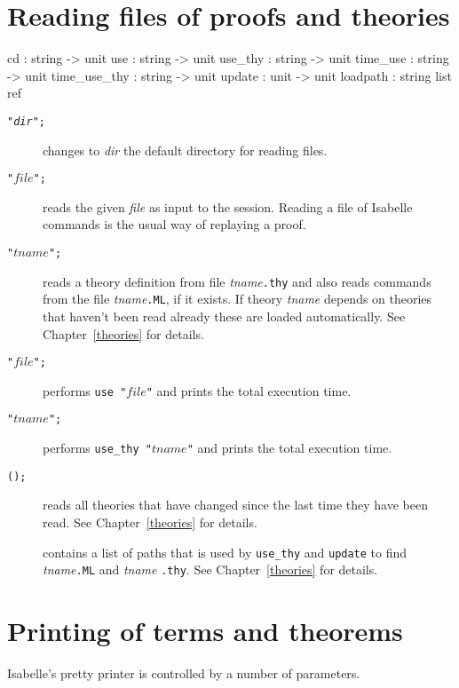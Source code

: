 \section{Reading files of proofs and theories}
\begin{ttbox} 
cd              : string -> unit
use             : string -> unit
use_thy         : string -> unit
time_use        : string -> unit
time_use_thy    : string -> unit
update          : unit -> unit
loadpath        : string list ref
\end{ttbox}
\begin{description}
\item[ \tt"{\it dir}";]  changes to {\it dir\/} the default
directory for reading files.

\item[ \tt"$file$";]  
reads the given {\it file} as input to the \ML{} session.  Reading a file
of Isabelle commands is the usual way of replaying a proof.

\item[ \tt"$tname$";]  
reads a theory definition from file {\it tname}{\tt.thy} and also reads
{\ML} commands from the file {\it tname}{\tt.ML}, if it exists.  If theory
{\it tname} depends on theories that haven't been read already these are
loaded automatically.
See Chapter~\ref{theories} for details.

\item[ \tt"$file$";]  
performs {\tt use~"$file$"} and prints the total execution time.

\item[ \tt"$tname$";]  
performs {\tt use_thy "$tname$"} and prints the total execution time.

\item[ \tt();]  
reads all theories that have changed since the last time they have been read.
See Chapter~\ref{theories} for details.

\item[] contains a list of paths that is used by 
{\tt use_thy} and {\tt update} to find {\it tname}{\tt.ML} and {\it tname}
{\tt.thy}. See Chapter~\ref{theories} for details.
\end{description}


\section{Printing of terms and theorems}
Isabelle's pretty printer is controlled by a number of parameters.

